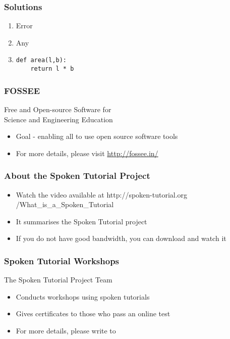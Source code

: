 \documentclass[17pt,compress]{beamer}
\begin{document}
\begin{frame}[fragile]
\frametitle{Solutions}
\label{sec-18}


\begin{enumerate}
\item Error
\vspace{16pt}
\item Any
\vspace{12pt}
\item \lstset{language=Python}
\begin{lstlisting}
def area(l,b):
    return l * b
\end{lstlisting}
\end{enumerate}
\end{frame}
\begin{frame}
\frametitle{FOSSEE}
{\color{blue}Free and Open-source Software for \\Science and Engineering Education} \\
\begin{itemize}
\item Goal - enabling all to use open source software tools
\item For more details, please visit {\color{blue}\url{http://fossee.in/}}
\end{itemize}
\end{frame}
\begin{frame}
\frametitle{About the Spoken Tutorial Project}
\begin{itemize}
\item Watch the video available at {\color{blue}http://spoken-tutorial.org /What\_is\_a\_Spoken\_Tutorial}
\item It summarises the Spoken Tutorial project \pause
\item If you do not have good bandwidth, you can download and watch it
\end{itemize}
\end{frame}
\begin{frame}
\frametitle{Spoken Tutorial Workshops}The Spoken Tutorial Project Team 
\begin{itemize}
\item Conducts workshops using spoken tutorials 
\item Gives certificates to those who pass an online test 
\item For more details, please write to \\ 
\end{itemize}
\end{frame}
\end{document}
